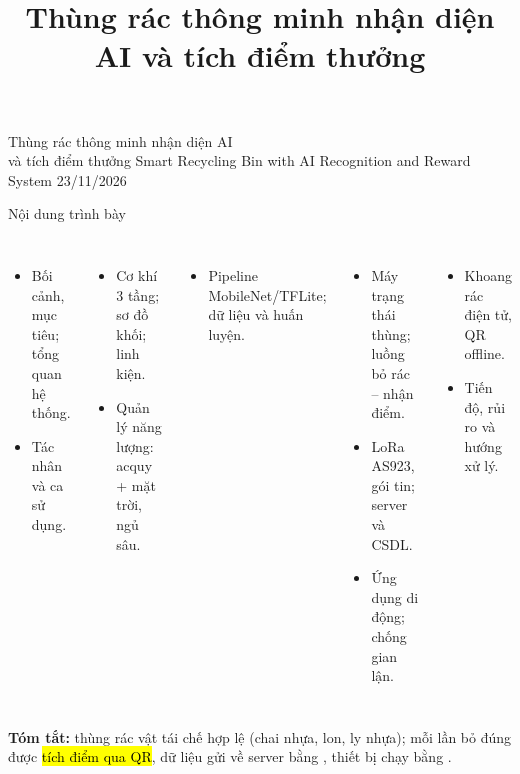 \documentclass[aspectratio=169,10pt,t]{beamer}
\title{Thùng rác thông minh nhận diện AI và tích điểm thưởng}
\begin{document}
{Thùng rác thông minh nhận diện AI\\và tích điểm thưởng}
{Smart Recycling Bin with AI Recognition and Reward System}
{23/11/2026}

\begin{frame}{Nội dung trình bày}
\footnotesize
\begin{columns}[T]
\begin{itemize}\setlength\itemsep{0pt}
  \item Bối cảnh, mục tiêu; tổng quan hệ thống.
  \item Tác nhân và ca sử dụng.
\end{itemize}\vskip4pt
\begin{itemize}\setlength\itemsep{0pt}
  \item Cơ khí 3 tầng; sơ đồ khối; linh kiện.
  \item Quản lý năng lượng: acquy + mặt trời, ngủ sâu.
\end{itemize}\vskip4pt
\begin{itemize}\setlength\itemsep{0pt}
  \item Pipeline MobileNet/TFLite; dữ liệu và huấn luyện.
\end{itemize}
\begin{itemize}\setlength\itemsep{0pt}
  \item Máy trạng thái thùng; luồng bỏ rác -- nhận điểm.
  \item LoRa AS923, gói tin; server và CSDL.
  \item Ứng dụng di động; chống gian lận.
\end{itemize}\vskip4pt
\begin{itemize}\setlength\itemsep{0pt}
  \item Khoang rác điện tử, QR offline.
  \item Tiến độ, rủi ro và hướng xử lý.
\end{itemize}
\end{columns}
\vskip8pt
{\scriptsize\textbf{Tóm tắt:} thùng rác  vật tái chế hợp lệ (chai nhựa, lon, ly nhựa); mỗi lần bỏ đúng được
\hl{tích điểm qua QR}, dữ liệu gửi về server bằng , thiết bị chạy bằng .\par}
\end{frame}
\end{document}
